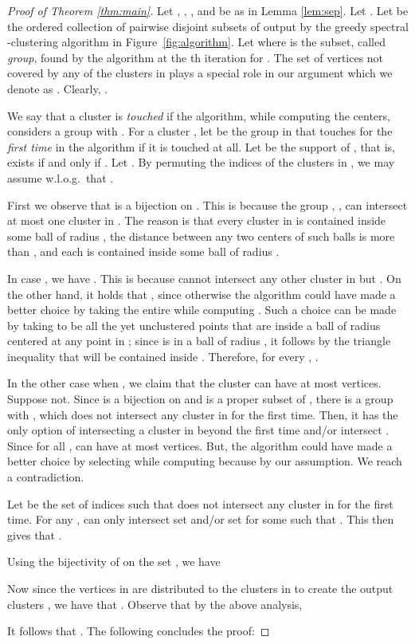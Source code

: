 \documentclass[11pt]{article}
\theoremstyle{plain}
\begin{document}
\begin{proof}[Proof of Theorem \ref{thm:main}]
Let , , , and  be as in
Lemma \ref{lem:sep}. Let
    . Let  be the ordered collection of
pairwise disjoint subsets of  output by
the greedy spectral -clustering algorithm
in Figure~\ref{fig:algorithm}. Let  where  is the subset, called \emph{group}, found by the algorithm at the th iteration for .
The set of vertices not covered by any of the clusters in 
plays a special role in our argument which we denote as
. Clearly,
.

We say that a cluster  is {\em touched}
if the algorithm, while computing the centers,
considers a group  with
.
For a cluster , let  be the group
in  that touches  for the {\em first time} in the
algorithm if it is touched at all.
Let  be the support
of , that is,  exists if and only if .
Let .
By permuting the indices of the clusters in , we may assume w.l.o.g.~that .

First we observe that  is a bijection on .
This is because the group , , can intersect at most one
cluster in . The reason is that every cluster in  is
contained inside some ball of radius , the distance between any two centers
of such balls is more than , and each  is contained inside some
ball of radius .

In case , we have
.
This is because  cannot intersect any other cluster in 
but . On the other hand, it holds that , since otherwise the algorithm could have made a better choice by taking the
entire  while computing . Such a choice can be made by taking
 to be all the yet unclustered points that are inside a ball of
radius  centered at any point in ; since  is in a ball of radius
, it follows by the triangle inequality that  will be contained inside
. Therefore, for every , .

In the other case when , we claim that the cluster  can have
at most  vertices. Suppose not. Since  is a bijection on  and
 is a proper subset of , there is a group  with
, which does not intersect any cluster in  for the
first time. Then, it has the only option of intersecting a cluster in  beyond the first time and/or intersect . Since  for all ,  can have at most  vertices. But, the algorithm could have made a better choice
by selecting  while computing  because  by our
assumption. We reach a contradiction.

Let  be the set of indices  such that  does not intersect any cluster
in  for the first time. For any ,
 can only intersect set  and/or set  for
some  such that . This then gives that
.

Using the bijectivity of  on the set ,
we have


Now since the vertices in  are distributed to
the clusters in  to create the output clusters , we have that
.
Observe that by the above analysis,

It follows that .
The following concludes the proof:

\end{proof}
\end{document}
